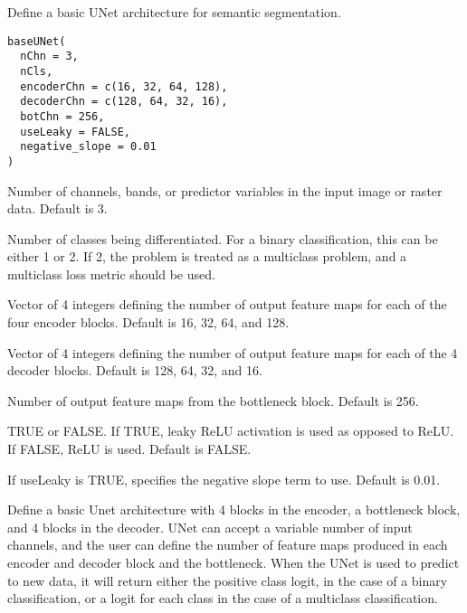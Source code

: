 \documentclass[a4paper]{book}
\begin{document}
%
\begin{Description}\relax
Define a basic UNet architecture for semantic segmentation.
\end{Description}
%
\begin{Usage}
\begin{verbatim}
baseUNet(
  nChn = 3,
  nCls,
  encoderChn = c(16, 32, 64, 128),
  decoderChn = c(128, 64, 32, 16),
  botChn = 256,
  useLeaky = FALSE,
  negative_slope = 0.01
)
\end{verbatim}
\end{Usage}
%
\begin{Arguments}
\begin{ldescription}
\item[\code{nChn}] Number of channels, bands, or predictor variables in the input
image or raster data. Default is 3.

\item[\code{nCls}] Number of classes being differentiated. For a binary classification,
this can be either 1 or 2. If 2, the problem is treated as a multiclass problem,
and a multiclass loss metric should be used.

\item[\code{encoderChn}] Vector of 4 integers defining the number of output
feature maps for each of the four encoder blocks. Default is 16, 32, 64, and 128.

\item[\code{decoderChn}] Vector of 4 integers defining the number of output feature
maps for each of the 4 decoder blocks. Default is 128, 64, 32, and 16.

\item[\code{botChn}] Number of output feature maps from the bottleneck block. Default
is 256.

\item[\code{useLeaky}] TRUE or FALSE. If TRUE, leaky ReLU activation is used as opposed
to ReLU. If FALSE, ReLU is used. Default is FALSE.

\item[\code{negative\_slope}] If useLeaky is TRUE, specifies the negative slope term
to use. Default is 0.01.
\end{ldescription}
\end{Arguments}
%
\begin{Details}\relax
Define a basic Unet architecture with 4 blocks in the encoder, a bottleneck
block, and 4 blocks in the decoder. UNet can accept a variable number of input
channels, and the user can define the number of feature maps produced in each
encoder and decoder block and the bottleneck. When the UNet is used to predict to
new data, it will return either the positive class logit, in the case of a binary
classification, or a logit for each class in the case of a multiclass classification.
\end{Details}
\end{document}
